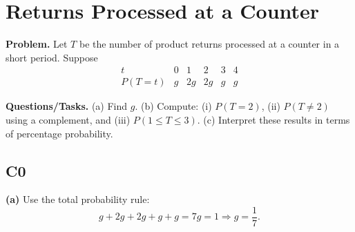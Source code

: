 		\section{Returns Processed at a Counter}
		
		\textbf{Problem.}
		Let $T$ be the number of product returns processed at a counter in a short period. Suppose
		\[
		\begin{array}{c|ccccc}
			t & 0 & 1 & 2 & 3 & 4\\
			\hline
			P(T=t) & g & 2g & 2g & g & g
		\end{array}
		\]
		
		\textbf{Questions/Tasks.}
		(a) Find $g$.
		(b) Compute: (i) $P(T=2)$, (ii) $P(T\ne 2)$ using a complement, and (iii) $P(1\le T\le 3)$.
		(c) Interpret these results in terms of percentage probability.
		
		\subsection*{C0}

		\textbf{(a)} Use the total probability rule:
		\[
		g+2g+2g+g+g=7g=1\Rightarrow g=\frac{1}{7}.
		\]

